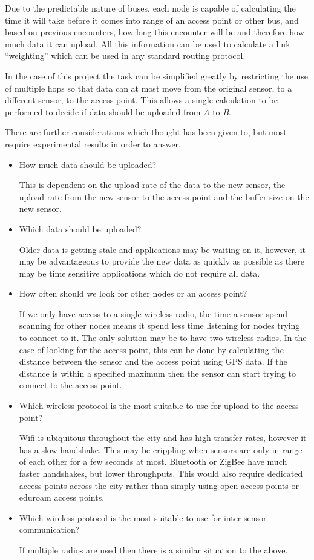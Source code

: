 Due to the predictable nature of buses, each node is capable of calculating the time it will take before it comes into range of an access point or other bus, and based on previous encounters, how long this encounter will be and therefore how much data it can upload. All this information can be used to calculate a link ``weighting'' which can be used in any standard routing protocol. 

In the case of this project the task can be simplified greatly by restricting the use of multiple hops so that data can at most move from the original sensor, to a different sensor, to the access point. This allows a single calculation to be performed to decide if data should be uploaded from \emph{A} to \emph{B}. 

There are further considerations which thought has been given to, but most require experimental results in order to answer. 

\begin{itemize}
	\item How much data should be uploaded?

		This is dependent on the upload rate of the data to the new sensor, the upload rate from the new sensor to the access point and the buffer size on the new sensor. 

	\item Which data should be uploaded?

		Older data is getting stale and applications may be waiting on it, however, it may be advantageous to provide the new data as quickly as possible as there may be time sensitive applications which do not require all data. 

	\item How often should we look for other nodes or an access point?

		If we only have access to a single wireless radio, the time a sensor spend scanning for other nodes means it spend less time listening for nodes trying to connect to it. The only solution may be to have two wireless radios. In the case of looking for the access point, this can be done by calculating the distance between the sensor and the access point using GPS data. If the distance is within a specified maximum then the sensor can start trying to connect to the access point. 

	\item Which wireless protocol is the most suitable to use for upload to the access point?

		Wifi is ubiquitous throughout the city and has high transfer rates, however it has a slow handshake. This may be crippling when sensors are only in range of each other for a few seconds at most. Bluetooth or ZigBee have much faster handshakes, but lower throughputs. This would also require dedicated access points across the city rather than simply using open access points or eduroam access points.

	\item Which wireless protocol is the most suitable to use for inter-sensor communication?

		If multiple radios are used then there is a similar situation to the above. 

\end{itemize}

